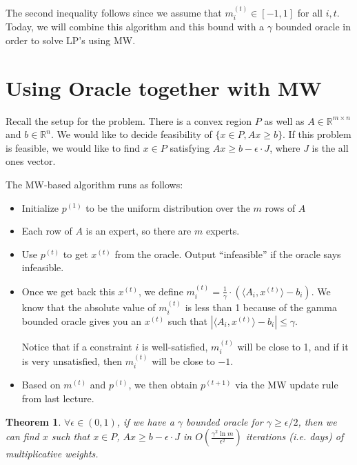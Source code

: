 \documentclass[11pt]{article}
\newcommand{\R}{\mathbb{R}}
\newtheorem{theorem}{Theorem}
\begin{document}
The second inequality follows since we assume that $m_i^{(t)}\in[-1,1]$ for all $i,t$. Today, we will combine this algorithm and this bound with a $\gamma$ bounded oracle in order to solve LP's using MW.

\section{Using Oracle together with MW} 
Recall the setup for the problem. There is a convex region $P$ as well as $A\in\R^{m\times n}$ and $b\in\R^n$. We would like to decide feasibility of $\{x\in P, Ax \ge b\}$. If this problem is feasible, we would like to find $x\in P$ satisfying $Ax\ge b - \epsilon\cdot J$, where $J$ is the all ones vector.

The MW-based algorithm runs as follows: 
\begin{itemize}
\item 
Initialize $p^{(1)}$ to be the uniform distribution over the $m$ rows of $A$ 
\item 
Each row of $A$ is an expert, so there are $m$ experts. 
\item Use $p^{(t)}$ to get $x^{(t)}$ from the oracle. Output ``infeasible'' if the oracle says infeasible. 

\item Once we get back this $x^{(t)}$, we define $m_i^{(t)} = \frac{1}{\gamma} \cdot \left( \langle A_{i}, x^{(t)} \rangle - b_i\right)$. We know that the absolute value of $m_i^{(t)}$ is less than 1 because of the gamma bounded oracle gives you an $x^{(t)}$ such that $ \left| \langle A_i, x^{(t)}\rangle - b_i \right| \leq \gamma$.

Notice that if a constraint $i$ is well-satisfied, $m_i^{(t)}$ will be close to 1, and if it is very unsatisfied, then $m_i^{(t)}$ will be close to $-1$.

\item Based on $m^{(t)}$ and $p^{(t)}$, we then obtain $p^{(t+1)}$ via the MW update rule from last lecture.

\end{itemize}

\begin{theorem} 
$\forall \epsilon \in (0,1)$, if we have a $\gamma$ bounded oracle for $\gamma \geq \epsilon /2$, then we can find $x$ such that $x \in P$, $Ax \geq b - \epsilon \cdot J$ in $O(\frac{\gamma^2 \ln m}{\epsilon^2})$ iterations (i.e. days) of multiplicative weights. 
\end{theorem}
\end{document}
